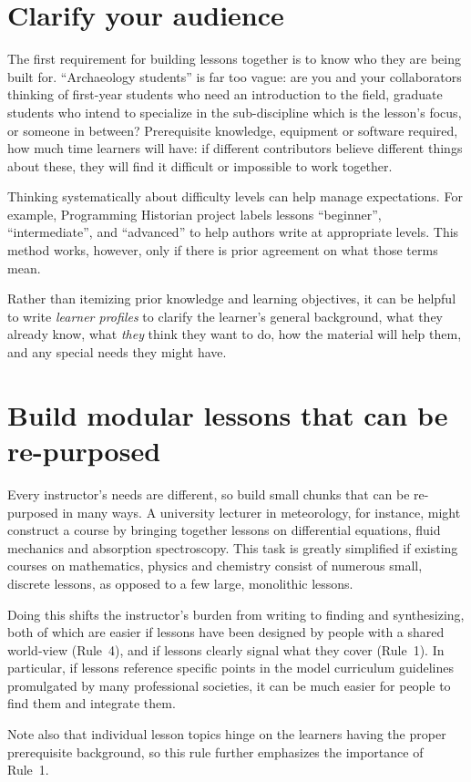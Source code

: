 \documentclass[10pt,letterpaper]{article}
\newcommand{\rulemajor}[1]{\section{#1}}
\begin{document}
\rulemajor{Clarify your audience}

The first requirement for building lessons together is
to know who they are being built for.
``Archaeology students'' is far too vague:
are you and your collaborators thinking of
first-year students who need an introduction to the field,
graduate students who intend to specialize in the sub-discipline which is the lesson's focus,
or someone in between?
Prerequisite knowledge,
equipment or software required,
how much time learners will have:
if different contributors believe different things about these,
they will find it difficult or impossible to work together.

Thinking systematically about difficulty levels can help manage expectations.
For example,
Programming Historian project labels lessons ``beginner'',
``intermediate'',
and ``advanced''
to help authors write at appropriate levels.
This method works, however, only if there is prior agreement on what those terms mean.

Rather than itemizing prior knowledge and learning objectives,
it can be helpful to write \emph{learner profiles} to clarify
the learner's general background,
what they already know,
what \emph{they} think they want to do,
how the material will help them,
and any special needs they might have.

\rulemajor{Build modular lessons that can be re-purposed}

Every instructor's needs are different,
so build small chunks that can be re-purposed in many ways.
A university lecturer in meteorology, for instance,
might construct a course by bringing together lessons on differential equations,
fluid mechanics and absorption spectroscopy.
This task is greatly simplified if existing courses on mathematics,
physics and chemistry consist of numerous small, discrete lessons,
as opposed to a few large, monolithic lessons.

Doing this shifts the instructor's burden from writing to finding and synthesizing,
both of which are easier if lessons have been designed by people with a shared world-view (Rule~4),
and if lessons clearly signal what they cover (Rule~1).
In particular,
if lessons reference specific points in the model curriculum guidelines promulgated by many professional societies,
it can be much easier for people to find them and integrate them.

Note also that individual lesson topics hinge on the learners having the proper prerequisite background,
so this rule further emphasizes the importance of Rule~1.
\end{document}
